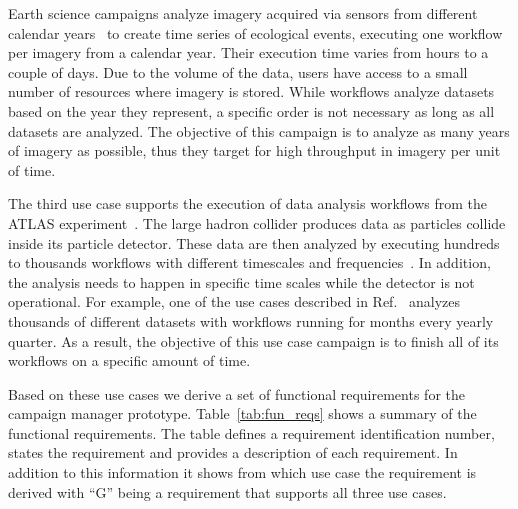 Earth science campaigns analyze imagery acquired via sensors from different 
calendar years~\cite{paraskevakos2019workflow} to create time series of 
ecological events, executing one workflow per imagery from a calendar year.
Their execution time varies from hours to a couple of days. Due to the volume 
of the data, users have access to a small number of resources where imagery is 
stored. While workflows analyze datasets based on the year they represent, a 
specific order is not necessary as long as all datasets are analyzed. The 
objective of this campaign is to analyze as many years of imagery as possible, 
thus they target for high throughput in imagery per unit of time.

The third use case supports the execution of data analysis workflows from the 
ATLAS experiment~\cite{atlas}. The large hadron collider produces data as 
particles collide inside its particle detector. These data are then analyzed 
by executing hundreds to thousands workflows with different timescales and 
frequencies~\cite{borodin2015big}. In addition, the analysis needs to happen 
in specific time scales while the detector is not operational. For example, 
one of the use cases described in Ref.~\cite{borodin2015big} analyzes 
thousands of different datasets with workflows running for months every yearly 
quarter. As a result, the objective of this use case campaign is to finish all 
of its workflows on a specific amount of time.

Based on these use cases we derive a set of functional requirements for the 
campaign manager prototype. Table~\ref{tab:fun_reqs} shows a summary of the 
functional requirements. The table defines a requirement identification 
number, states the requirement and provides a description of each requirement.
In addition to this information it shows from which use case the requirement 
is derived with ``G'' being a requirement that supports all three use cases. 

